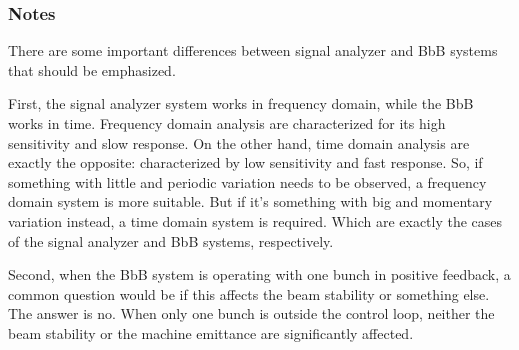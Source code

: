 \subsubsection{Notes}
There are some important differences between signal analyzer and BbB systems that should be emphasized.

First, the signal analyzer system works in frequency domain, while the BbB works in time. Frequency domain analysis are characterized for its high sensitivity and slow response. On the other hand, time domain analysis are exactly the opposite: characterized by low sensitivity and fast response. So, if something with little and periodic variation needs to be observed, a frequency domain system is more suitable. But if it's something with big and momentary variation instead, a time domain system is required. Which are exactly the cases of the signal analyzer and BbB systems, respectively.

Second, when the BbB system is operating with one bunch in positive feedback, a common question would be if this affects the beam stability or something else. The answer is no. When only one bunch is outside the control loop, neither the beam stability or the machine emittance are significantly affected.

\pagebreak